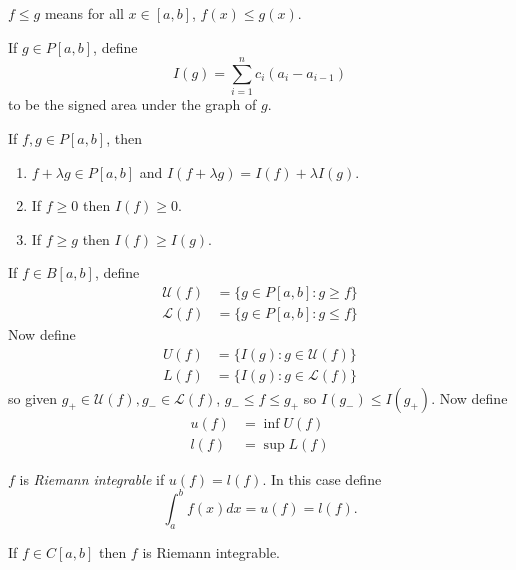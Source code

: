 \documentclass[a4paper]{article}
\newcommand*{\riem}[1]{\mathcal{#1}}
\theoremstyle{definition}
\begin{document}
\begin{notation}
  \(f \leq g\) means for all \(x \in [a, b]\), \(f(x) \leq g(x)\).
\end{notation}

If \(g \in P[a, b]\), define
\[
  I(g) = \sum_{i=1}^{n}c_i(a_i - a_{i-1})
\]
to be the signed area under the graph of \(g\).

\begin{lemma}
  If \(f,g \in P[a, b]\), then
  \begin{enumerate}
  \item \(f + \lambda g \in P[a, b]\) and \(I(f + \lambda g) = I(f) + \lambda I(g)\).
  \item If \(f \geq 0\) then \(I(f) \geq 0\).
  \item If \(f \geq g\) then \(I(f) \geq I(g)\).
  \end{enumerate}
\end{lemma}


If \(f \in B[a, b]\), define
\begin{align*}
  \riem U(f) &= \{ g \in P[a, b]: g \geq f\} \\
  \riem L(f) &= \{ g \in P[a, b]: g \leq f\}
\end{align*}
Now define
\begin{align*}
  U(f) &= \{ I(g): g \in \riem U(f) \} \\
  L(f) &= \{ I(g): g \in \riem L(f) \}
\end{align*}
so given \(g_+ \in \riem U(f), g_- \in \riem L(f)\), \(g_- \leq f \leq g_+\) so \(I(g_-) \leq I(g_+)\). Now define
\begin{align*}
  u(f) &= \inf U(f) \\
  l(f) &= \sup L(f)
\end{align*}

\begin{definition}
  \(f\) is \emph{Riemann integrable} if \(u(f) = l(f)\). In this case define
  \[
    \int_{a}^{b} f(x) dx = u(f) = l(f).
  \]
\end{definition}

\begin{theorem}
  If \(f \in C[a, b]\) then \(f\) is Riemann integrable.
\end{theorem}
\end{document}
